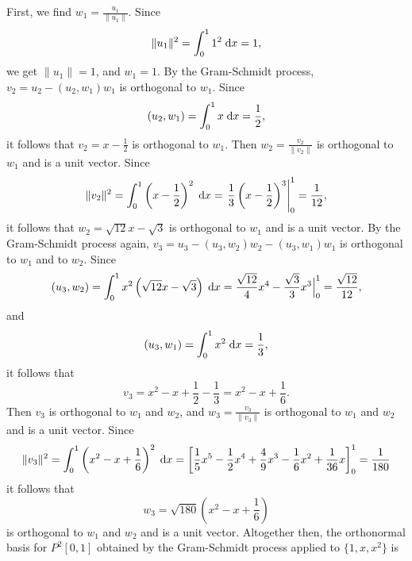 \documentclass{homework}
\begin{document}
	\question First, we find $w_1 = \frac{u_1}{\lVert u_1\rVert}$. Since
	\begin{equation}
		\lVert u_1\rVert^2 = \int_0^1 1^2 \;\text{d} x = 1,
	\end{equation}
	we get $\lVert u_1 \rVert = 1$, and $w_1 = 1$. By the Gram-Schmidt process, $v_2 = u_2 - (u_2, w_1) w_1$ is orthogonal to $w_1$. Since
	\begin{equation}
		(u_2, w_1) = \int_0^1 x\;\text{d} x = \frac{1}{2},
	\end{equation}
	it follows that $v_2 = x - \frac{1}{2}$ is orthogonal to $w_1$. Then $w_2 = \frac{v_2}{\lVert v_2\rVert}$ is orthogonal to $w_1$ and is a unit vector. Since
	\begin{equation}
		\lVert v_2\rVert^2 = \int_0^1 \left(x - \frac{1}{2}\right)^2\;\text{d} x = \left.\frac{1}{3}\left(x-\frac{1}{2}\right)^3\right\vert_0^1 = \frac{1}{12},
	\end{equation}
	it follows that $w_2 = \sqrt{12}x - \sqrt{3}$ is orthogonal to $w_1$ and is a unit vector. By the Gram-Schmidt process again, $v_3 = u_3 - (u_3,w_2)w_2 - (u_3,w_1)w_1$ is orthogonal to $w_1$ and to $w_2$. Since
	\begin{equation}
		(u_3, w_2) = \int_0^1 x^2\left(\sqrt{12}x - \sqrt{3}\right)\;\text{d} x = \frac{\sqrt{12}}{4}x^4 - \frac{\sqrt{3}}{3}x^3\Big\vert_0^1 = \frac{\sqrt{12}}{12},
	\end{equation}
	and
	\begin{equation}
		(u_3,w_1) = \int_0^1 x^2\;\text{d} x = \frac{1}{3},
	\end{equation}
	it follows that
	\begin{equation}
		v_3 = x^2 - x + \frac{1}{2} - \frac{1}{3} = x^2-x +\frac{1}{6}.
	\end{equation}
	Then $v_3$ is orthogonal to $w_1$ and $w_2$, and $w_3 = \frac{v_3}{\lVert v_3\rVert}$ is orthogonal to $w_1$ and $w_2$ and is a unit vector. Since
	\begin{equation}
		\lVert v_3\rVert^2 = \int_0^1 \left(x^2 - x +\frac{1}{6}\right)^2\;\text{d} x = \left[\frac{1}{5}x^5 - \frac{1}{2}x^4 + \frac{4}{9}x^3 - \frac{1}{6}x^2 +\frac{1}{36}x\right]_0^1 = \frac{1}{180}
	\end{equation}
	it follows that
	\begin{equation}
		w_3 = \sqrt{180}\left(x^2-x+\frac{1}{6}\right)
	\end{equation}
	is orthogonal to $w_1$ and $w_2$ and is a unit vector. Altogether then, the orthonormal basis for $P^2[0,1]$ obtained by the Gram-Schmidt process applied to $\{1,x,x^2\}$ is
\end{document}
